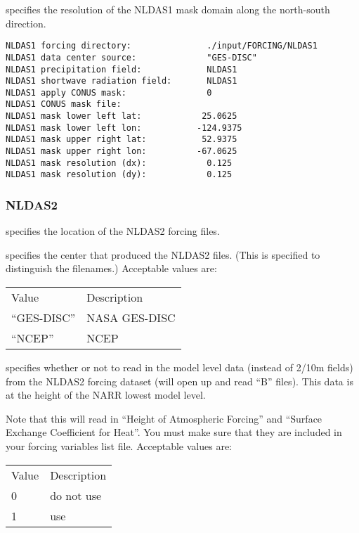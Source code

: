   specifies the resolution of the 
 NLDAS1 mask domain along the north-south direction.
 

 \begin{Verbatim}[frame=single]
NLDAS1 forcing directory:               ./input/FORCING/NLDAS1
NLDAS1 data center source:              "GES-DISC"
NLDAS1 precipitation field:             NLDAS1
NLDAS1 shortwave radiation field:       NLDAS1
NLDAS1 apply CONUS mask:                0
NLDAS1 CONUS mask file:
NLDAS1 mask lower left lat:            25.0625
NLDAS1 mask lower left lon:           -124.9375
NLDAS1 mask upper right lat:           52.9375
NLDAS1 mask upper right lon:          -67.0625
NLDAS1 mask resolution (dx):            0.125
NLDAS1 mask resolution (dy):            0.125
 \end{Verbatim}

 
 \subsubsection{NLDAS2} \label{sssec:forcings_nldas2}
 

 
  specifies the location of the NLDAS2
 forcing files.

  specifies the center that produced
 the NLDAS2 files. (This is specified to distinguish the filenames.) 
 Acceptable values are:

 \begin{tabular}{ll}
 Value        & Description   \\
 ``GES-DISC'' & NASA GES-DISC \\
 ``NCEP''     & NCEP          \\
 \end{tabular}

  specifies whether or not to
 read in the model level data (instead of 2/10m fields) from the
 NLDAS2 forcing dataset (will open up and read ``B'' files).
 This data is at the height of the NARR lowest model level.

 Note that this will read in ``Height of Atmospheric Forcing''
 and ``Surface Exchange Coefficient for Heat''.  You must make
 sure that they are included in your forcing variables list file.
 Acceptable values are:

 \begin{tabular}{ll}
 Value & Description \\
 0     & do not use  \\
 1     & use         \\
 \end{tabular}

